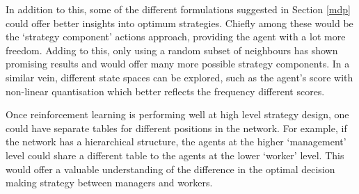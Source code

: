 \documentclass[conference]{IEEEtran}
\begin{document}
In addition to this,
some of the different formulations suggested in Section \ref{mdp}
could offer better insights into optimum strategies.
Chiefly among these would be the `strategy component' actions approach,
providing the agent with a lot more freedom.
Adding to this, only using a random subset of neighbours
has shown promising results \cite{sociallearning}
and would offer many more possible strategy components.
In a similar vein, different state spaces can be explored,
such as the agent's score with non-linear quantisation
which better reflects the frequency different scores.

Once reinforcement learning is performing well at high level strategy design,
one could have separate tables for different positions in the network.
For example, if the network has a hierarchical structure,
the agents at the higher `management' level could share a different table
to the agents at the lower `worker' level.
This would offer a valuable understanding of the difference in the
optimal decision making strategy between managers and workers.
\end{document}

